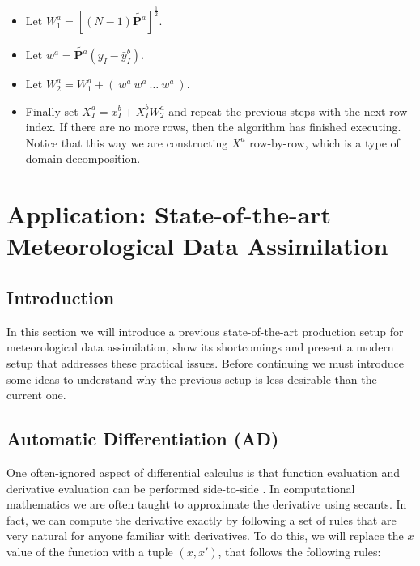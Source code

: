 \documentclass{article}
\begin{document}
\begin{itemize}
\item Let $W_1^a = [(N - 1) \tilde{\mathbf{P}^a}]^\frac{1}{2}$.
\item Let $w^a = \tilde{\mathbf{P}^a} (y_I - \bar{y}_I^b)$.
\item Let $W_2^a = W_1^a + ( \: w^a \: w^a \: \dots \: w^a \: )$.
\item Finally set $X_I^a = \bar{x}_I^b + X_I^b W_2^a$ and repeat the previous steps with the next row index. If there are no more rows, then the algorithm has finished executing. Notice that this way we are constructing $X^a$ row-by-row, which is a type of domain decomposition.
\end{itemize}

\section{Application: State-of-the-art Meteorological Data Assimilation}

\subsection{Introduction}

In this section we will introduce a previous state-of-the-art production setup for meteorological data assimilation, show its shortcomings and present a modern setup that addresses these practical issues. Before continuing we must introduce some ideas to understand why the previous setup is less desirable than the current one. \\

\subsection{Automatic Differentiation (AD)}

One often-ignored aspect of differential calculus is that function evaluation and derivative evaluation can be performed side-to-side \cite{ADTheory}. In computational mathematics we are often taught to approximate the derivative using secants. In fact, we can compute the derivative exactly by following a set of rules that are very natural for anyone familiar with derivatives. To do this, we will replace the $x$ value of the function with a tuple $(x, x')$, that follows the following rules:
\end{document}
